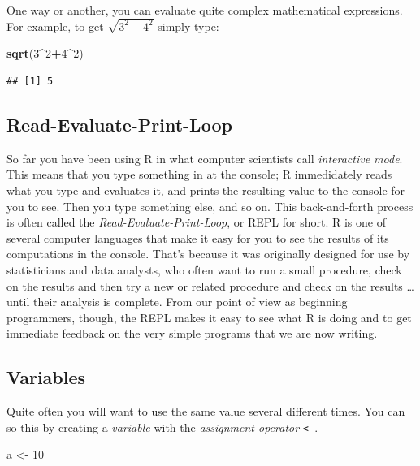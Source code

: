 \documentclass[]{book}
\makeatletter
\newenvironment{Shaded}{\begin{snugshade}}{\end{snugshade}}
\newcommand{\KeywordTok}[1]{\textcolor[rgb]{0.13,0.29,0.53}{\textbf{#1}}}
\newcommand{\DecValTok}[1]{\textcolor[rgb]{0.00,0.00,0.81}{#1}}
\newcommand{\StringTok}[1]{\textcolor[rgb]{0.31,0.60,0.02}{#1}}
\newcommand{\OperatorTok}[1]{\textcolor[rgb]{0.81,0.36,0.00}{\textbf{#1}}}
\newcommand{\NormalTok}[1]{#1}
\newenvironment{kframe}{%
\medskip{}
\setlength{\fboxsep}{.8em}
 \def\at@end@of@kframe{}%
 \ifinner\ifhmode%
  \def\at@end@of@kframe{\end{minipage}}%
  \begin{minipage}{\columnwidth}%
 \fi\fi%
 \def\FrameCommand##1{\hskip\@totalleftmargin \hskip-\fboxsep
 \colorbox{shadecolor}{##1}\hskip-\fboxsep
     \hskip-\linewidth \hskip-\@totalleftmargin \hskip\columnwidth}%
 \MakeFramed {\advance\hsize-\width
   \@totalleftmargin\z@ \linewidth\hsize
   \@setminipage}}%
 {\par\unskip\endMakeFramed%
 \at@end@of@kframe}
\renewenvironment{Shaded}{\begin{kframe}}{\end{kframe}}
\theoremstyle{definition}
\theoremstyle{definition}
\theoremstyle{definition}
\theoremstyle{remark}
\makeatother
\begin{document}
One way or another, you can evaluate quite complex mathematical
expressions. For example, to get \(\sqrt{3^2 + 4^2}\) simply type:

\begin{Shaded}
\begin{Highlighting}[]
\KeywordTok{sqrt}\NormalTok{(}\DecValTok{3}\OperatorTok{^}\DecValTok{2}\OperatorTok{+}\DecValTok{4}\OperatorTok{^}\DecValTok{2}\NormalTok{)}
\end{Highlighting}
\end{Shaded}

\begin{verbatim}
## [1] 5
\end{verbatim}

\subsection{Read-Evaluate-Print-Loop}\label{read-evaluate-print-loop}

So far you have been using R in what computer scientists call
\emph{interactive mode}. This means that you type something in at the
console; R immedidately reads what you type and evaluates it, and prints
the resulting value to the console for you to see. Then you type
something else, and so on. This back-and-forth process is often called
the \emph{Read-Evaluate-Print-Loop}, or REPL  for short. R
is one of several computer languages that make it easy for you to see
the results of its computations in the console. That's because it was
originally designed for use by statisticians and data analysts, who
often want to run a small procedure, check on the results and then try a
new or related procedure and check on the results \ldots{} until their
analysis is complete. From our point of view as beginning programmers,
though, the REPL makes it easy to see what R is doing and to get
immediate feedback on the very simple programs that we are now writing.

\subsection{Variables}\label{idea-variables}

Quite often you will want to use the same value several different times.
You can so this by creating a \emph{variable}  with the
\emph{assignment operator} \texttt{\textless{}-}.

\begin{Shaded}
\begin{Highlighting}[]
\NormalTok{a <-}\StringTok{ }\DecValTok{10}
\end{Highlighting}
\end{Shaded}
\end{document}
